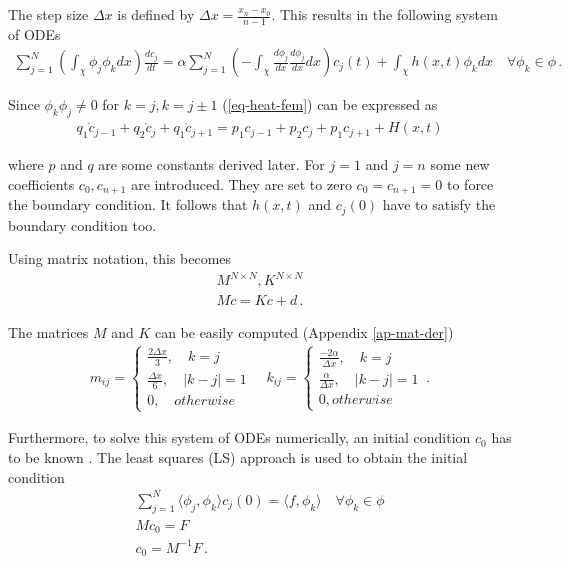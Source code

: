 The step size \(\Delta x\) is defined by \(\Delta x = \frac{x_n - x_0}{n-1}\). \label{def-delta-x}
This results in the following system of ODEs
\begin{gather}
\sum_{j=1}^N\left(\int_{\chi} \phi_{j}\phi_{k}dx\right)\frac{dc_{j}}{dt} = \alpha \sum_{j = 1}^N\left(-\int_{\chi} \frac{d\phi_{j}}{dx}\frac{d\phi_{j}}{dx}dx\right)c_{j}(t) + \int_{\chi}h(x, t) \phi_{k} dx
\quad \forall \phi_{k} \in \phi \,. \label{eq-heat-fem}
\end{gather}

Since \(\phi_k \phi_j \neq 0\) for \(k = j, k = j \pm 1\) (\ref{eq-heat-fem}) 
can be expressed as 
\begin{gather}
q_1\dot{c}_{j-1} + q_2 \dot{c}_{j} + q_1 \dot{c}_{j+1} = p_1 c_{j-1} + p_2 c_{j} + p_1 c_{j+1} + H(x,t) 
\end{gather}

where \(p\) and \(q\) are some constants derived later.
For \(j=1\)  and \(j=n\) some new coefficients \(c_0, c_{n+1}\) are introduced.
They are set to zero \(c_0 = c_{n+1} = 0\) to force the boundary condition.
It follows that \(h(x, t)\) and \(c_j(0)\) have to satisfy the boundary condition too.

Using matrix notation, this becomes
\begin{gather}
M^{N \times N}, K^{N \times N} \\
M\dot{c} = Kc + d \,. \label{eq-heat-almost-ss}
\end{gather}

The matrices \(M\) and \(K\) can be easily computed (Appendix \ref{ap-mat-der})
\begin{gather}
m_{ij} = \begin{cases}
\frac{2\Delta x}{3}, \quad k = j \\
\frac{\Delta x}{6}, \quad |k - j| = 1 \\
0, \quad otherwise 
\end{cases} \label{def-mat-a}
\quad
k_{ij} = \begin{cases}
\frac{-2\alpha}{\Delta x}, \quad k = j \\
\frac{\alpha}{\Delta x}, \quad |k - j| = 1 \\
0, otherwise
\end{cases}\,.
\end{gather}

Furthermore, to solve this system of ODEs numerically, an initial condition \(c_{0}\) has to be known \cite{Gustafsson2011b}.
The least squares (LS) approach is used to obtain the initial condition \cite{Gustafsson2011c}
\begin{gather}
\sum_{j = 1}^N \langle \phi_j, \phi_k \rangle c_{j}(0) = \langle f, \phi_{k} \rangle \quad \forall \phi_k \in \phi \\
Mc_{0} = F \label{F}\\ 
c_{0} = M^{-1}F \,. \label{c0}
\end{gather}

